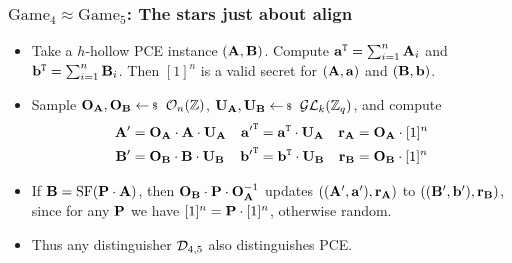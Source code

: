 \documentclass[xcolor=table,10pt,aspectratio=169]{beamer}
\begin{document}
\begin{frame}
  \frametitle{\(\text{Game}_4 \approx \text{Game}_5\): The stars just about align}
  \begin{itemize}[label=\textbullet]
    \item<1-> Take a \(h\)-hollow PCE instance \((\mathbf{A}, \mathbf{B})\). Compute \(\mathbf{a}^{\mathtt{T}} = \sum_{i=1}^{n} \mathbf{A}_i\) and \(\mathbf{b}^{\mathtt{T}} = \sum_{i=1}^{n} \mathbf{B}_i\). Then \([1]^n\) is a valid secret for \((\mathbf{A},\mathbf{a})\) and \((\mathbf{B},\mathbf{b})\).
      \vfill
    \item<2-> Sample \(\mat{O}_\mat{A}, \mat{O}_\mat{B} \sample \Ort_n(\ZZ)\), \(\mat{U}_\mat{A}, \mat{U}_\mat{B} \sample \GL_k(\ZZ_q)\), and compute
      \begin{align*}
        \mathbf{A'} &= \mathbf{O}_\mathbf{A}\cdot\mathbf{A}\cdot\mathbf{U}_\mathbf{A} &\mathbf{a'}^{\mathtt{T}} &= \mathbf{a}^{\mathtt{T}}\cdot\mathbf{U}_\mathbf{A} &\mathbf{r}_\mathbf{A} &= \mathbf{O}_\mathbf{A}\cdot [1]^n \\
        \mathbf{B'} &= \mathbf{O}_\mathbf{B}\cdot\mathbf{B}\cdot\mathbf{U}_\mathbf{B} &\mathbf{b'}^{\mathtt{T}} &= \mathbf{b}^{\mathtt{T}}\cdot\mathbf{U}_\mathbf{B} &\mathbf{r}_\mathbf{B} &= \mathbf{O}_\mathbf{B}\cdot [1]^n
      \end{align*}
      \vfill
    \item<3-> If \(\mathbf{B} = \operatorname{SF}(\mathbf{P}\cdot\mathbf{A})\), then \(\mathbf{O}_\mathbf{B}\cdot\mathbf{P}\cdot\mathbf{O}_\mathbf{A}^{-1}\) updates \(((\mathbf{A'}, \mathbf{a'}), \mathbf{r}_\mathbf{A})\) to \(((\mathbf{B'}, \mathbf{b'}), \mathbf{r}_\mathbf{B})\), since for any \(\mathbf{P}\) we have \([1]^n = \mathbf{P}\cdot [1]^n\), otherwise random.
      \vfill
    \item<4-> Thus any distinguisher \(\mathcal{D}_{4,5}\) also distinguishes PCE.
  \end{itemize}
\end{frame}
\end{document}
